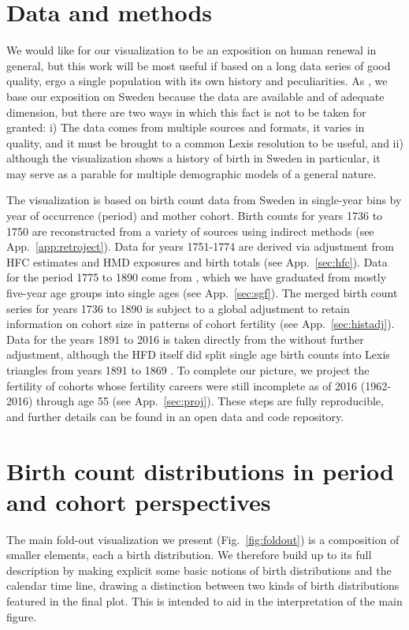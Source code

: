 \documentclass{article}
\begin{document}
\section{Data and methods}
\label{sec:data}
We would like for our visualization to be an exposition on human renewal in general, but this work will be most useful if based on a long data series of good quality, ergo a single population with its own history and peculiarities. As \citet{perozzo1880della}, we base our exposition on Sweden because the data are available and of adequate dimension, but there are two ways in which this fact is not to be taken for granted: i) The data comes from multiple sources and formats, it varies in quality, and it must be brought to a common Lexis resolution to be useful, and ii) although the visualization shows a history of birth in Sweden in particular, it may serve as a parable for multiple demographic models of a general nature.

The visualization is based on birth count data from Sweden in single-year bins by year of occurrence (period) and mother cohort. Birth counts for years 1736 to 1750 are reconstructed from a variety of sources \citep{HFC, HMD, sweden1969historisk} using indirect methods (see App.~\ref{app:retroject}). Data for years 1751-1774 are derived via adjustment from HFC estimates and HMD exposures and birth totals (see App.~\ref{sec:hfc}). Data for the period 1775 to 1890 come from \citet{sgf1907}, which we have graduated from mostly five-year age groups into single ages (see App.~\ref{sec:sgf}). The merged birth count series for years 1736 to 1890 is subject to a global adjustment to retain information on cohort size in patterns of cohort fertility (see App.~\ref{sec:histadj}). Data for the years 1891 to 2016 is taken directly from the \citet{HFD} without further adjustment, although the HFD itself did split single age birth counts into Lexis triangles from years 1891 to 1869 \citep{persson2010human}. To complete our picture, we project the fertility of cohorts whose fertility careers were still incomplete as of 2016 (1962-2016) through age 55 (see App.~\ref{sec:proj}). These steps are fully reproducible, and further details can be found in an open data and code repository.

\section{Birth count distributions in period and cohort perspectives}
\label{sec:birthdist}

The main fold-out visualization we present (Fig.~\ref{fig:foldout}) is a composition of smaller elements, each a birth distribution. We therefore build up to its full description by making explicit some basic notions of birth distributions and the calendar time line, drawing a distinction between two kinds of birth distributions featured in the final plot. This is intended to aid in the interpretation of the main figure. 
\end{document}
